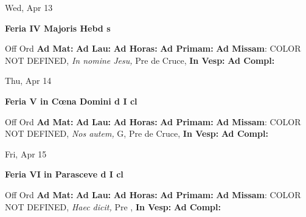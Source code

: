 \documentclass[10pt]{memoir}
\begin{document}
\begin{center}
\begin{minipage}{3.5in}
\vspace{2em}
\begin{center}Wed, Apr 13
\end{center}
\textbf{ \large Feria IV Majoris Hebd
\textnormal{\normalsize s}}

\begin{justify}Off Ord
\textbf{Ad Mat: }
\textbf{Ad Lau: }
\textbf{Ad Horas: }
\textbf{Ad Primam: }\textbf{Ad Missam}: COLOR NOT DEFINED, \textit{In nomine Jesu,} Pre de Cruce, 
\textbf{In Vesp: }
\textbf{Ad Compl: }
\end{justify}
\end{minipage}
\end{center}

\begin{center}
\begin{minipage}{3.5in}
\vspace{2em}
\begin{center}Thu, Apr 14
\end{center}
\textbf{ \large Feria V in Cœna Domini
\textnormal{\normalsize d I cl}}

\begin{justify}Off Ord
\textbf{Ad Mat: }
\textbf{Ad Lau: }
\textbf{Ad Horas: }
\textbf{Ad Primam: }\textbf{Ad Missam}: COLOR NOT DEFINED, \textit{Nos autem,} G, Pre de Cruce, 
\textbf{In Vesp: }
\textbf{Ad Compl: }
\end{justify}
\end{minipage}
\end{center}

\begin{center}
\begin{minipage}{3.5in}
\vspace{2em}
\begin{center}Fri, Apr 15
\end{center}
\textbf{ \large Feria VI in Parasceve
\textnormal{\normalsize d I cl}}

\begin{justify}Off Ord
\textbf{Ad Mat: }
\textbf{Ad Lau: }
\textbf{Ad Horas: }
\textbf{Ad Primam: }\textbf{Ad Missam}: COLOR NOT DEFINED, \textit{Haec dicit,} Pre , 
\textbf{In Vesp: }
\textbf{Ad Compl: }
\end{justify}
\end{minipage}
\end{center}
\end{document}
